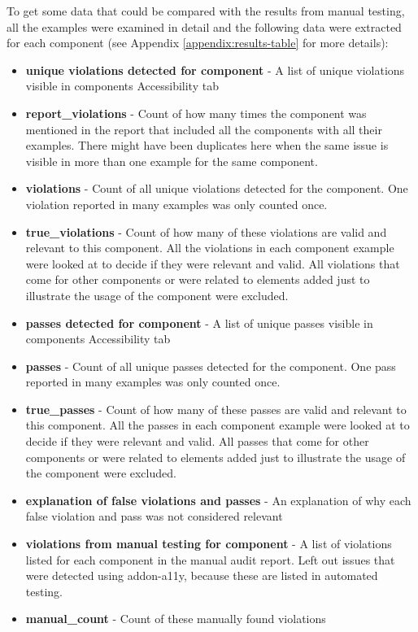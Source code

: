 \documentclass{master_thesis}
\begin{document}
To get some data that could be compared with the results from manual testing, all the examples were examined in detail and the following data were extracted for each component (see Appendix \ref{appendix:results-table} for more details):
\begin{itemize}
	\item \textbf{unique violations detected for component} - A list of unique violations visible in components Accessibility tab
	\item \textbf{report\_violations} - Count of how many times the component was mentioned in the report that included all the components with all their examples. There might have been duplicates here when the same issue is visible in more than one example for the same component.
	\item \textbf{violations} - Count of all unique violations detected for the component. One violation reported in many examples was only counted once.
	\item \textbf{true\_violations} - Count of how many of these violations are valid and relevant to this component. All the violations in each component example were looked at to decide if they were relevant and valid. All violations that come for other components or were related to elements added just to illustrate the usage of the component were excluded.
	\item \textbf{passes detected for component} - A list of unique passes visible in components Accessibility tab
	\item \textbf{passes} - Count of all unique passes detected for the component. One pass reported in many examples was only counted once.
	\item \textbf{true\_passes} - Count of how many of these passes are valid and relevant to this component. All the passes in each component example were looked at to decide if they were relevant and valid. All passes that come for other components or were related to elements added just to illustrate the usage of the component were excluded.
	\item \textbf{explanation of false violations and passes} - An explanation of why each false violation and pass was not considered relevant
	\item \textbf{violations from manual testing for component} - A list of violations listed for each component in the manual audit report. Left out issues that were detected using addon-a11y, because these are listed in automated testing.
	\item \textbf{manual\_count} - Count of these manually found violations
\end{itemize}
\end{document}
